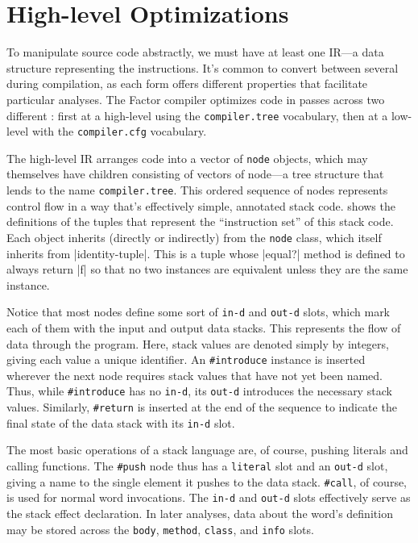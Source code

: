\section{High-level Optimizations}\label{sec:compiler:tree}

To manipulate source code abstractly, we must have at least one \gls{IR}---a
data structure representing the instructions.  It's common to convert between
several  during compilation, as each form offers different
properties that facilitate particular analyses.  The Factor compiler optimizes
code in passes across two different : first at a high-level using
the \Verb|compiler.tree| vocabulary, then at a low-level with the
\Verb|compiler.cfg| vocabulary.


The high-level \gls{IR} arranges code into a vector of \Verb|node| objects,
which may themselves have children consisting of vectors of node---a tree
structure that lends to the name \Verb|compiler.tree|.  This ordered sequence
of nodes represents control flow in a way that's effectively simple, annotated
stack code.   shows the definitions of the tuples that represent
the ``instruction set'' of this stack code.  Each object inherits (directly or
indirectly) from the \Verb|node| class, which itself inherits from
\factor|identity-tuple|.  This is a tuple whose \factor|equal?| method is
defined to always return \factor|f| so that no two instances are equivalent
unless they are the same instance.

Notice that most nodes define some sort of \Verb|in-d| and \Verb|out-d|
slots, which mark each of them with the input and output data stacks.  This
represents the flow of data through the program.  Here, stack values are
denoted simply by integers, giving each value a unique identifier.  An
\Verb|#introduce| instance is inserted wherever the next node requires stack
values that have not yet been named.  Thus, while \Verb|#introduce| has no
\Verb|in-d|, its \Verb|out-d| introduces the necessary stack values.
Similarly, \Verb|#return| is inserted at the end of the sequence to indicate
the final state of the data stack with its \Verb|in-d| slot.

The most basic operations of a stack language are, of course, pushing literals
and calling functions.  The \Verb|#push| node thus has a \Verb|literal|
slot and an \Verb|out-d| slot, giving a name to the single element it pushes
to the data stack.  \Verb|#call|, of course, is used for normal word
invocations.  The \Verb|in-d| and \Verb|out-d| slots effectively serve as
the stack effect declaration.  In later analyses, data about the word's
definition may be stored across the \Verb|body|, \Verb|method|,
\Verb|class|, and \Verb|info| slots.

